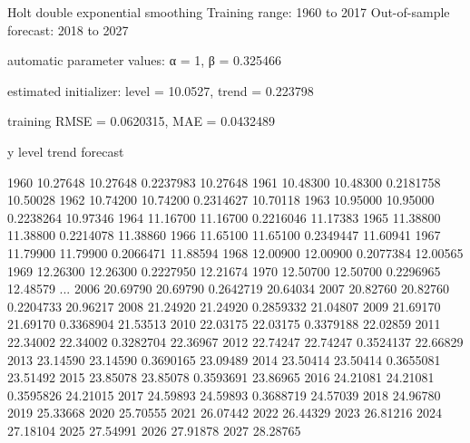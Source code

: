 \documentclass{article}
\begin{document}
\begin{script}[htbp]
  \caption{Partial listing of results from the first Australian
    population example in Section~\ref{sec:auto}.}
  \label{list:results}
\begin{code}
Holt double exponential smoothing
Training range: 1960 to 2017
Out-of-sample forecast: 2018 to 2027

automatic parameter values:
  α = 1, β = 0.325466

estimated initializer:
  level = 10.0527, trend = 0.223798

training RMSE = 0.0620315, MAE = 0.0432489

                y        level        trend     forecast

1960     10.27648     10.27648    0.2237983     10.27648
1961     10.48300     10.48300    0.2181758     10.50028
1962     10.74200     10.74200    0.2314627     10.70118
1963     10.95000     10.95000    0.2238264     10.97346
1964     11.16700     11.16700    0.2216046     11.17383
1965     11.38800     11.38800    0.2214078     11.38860
1966     11.65100     11.65100    0.2349447     11.60941
1967     11.79900     11.79900    0.2066471     11.88594
1968     12.00900     12.00900    0.2077384     12.00565
1969     12.26300     12.26300    0.2227950     12.21674
1970     12.50700     12.50700    0.2296965     12.48579
...
2006     20.69790     20.69790    0.2642719     20.64034
2007     20.82760     20.82760    0.2204733     20.96217
2008     21.24920     21.24920    0.2859332     21.04807
2009     21.69170     21.69170    0.3368904     21.53513
2010     22.03175     22.03175    0.3379188     22.02859
2011     22.34002     22.34002    0.3282704     22.36967
2012     22.74247     22.74247    0.3524137     22.66829
2013     23.14590     23.14590    0.3690165     23.09489
2014     23.50414     23.50414    0.3655081     23.51492
2015     23.85078     23.85078    0.3593691     23.86965
2016     24.21081     24.21081    0.3595826     24.21015
2017     24.59893     24.59893    0.3688719     24.57039
2018                                            24.96780
2019                                            25.33668
2020                                            25.70555
2021                                            26.07442
2022                                            26.44329
2023                                            26.81216
2024                                            27.18104
2025                                            27.54991
2026                                            27.91878
2027                                            28.28765
\end{code}
\end{script}
\end{document}
